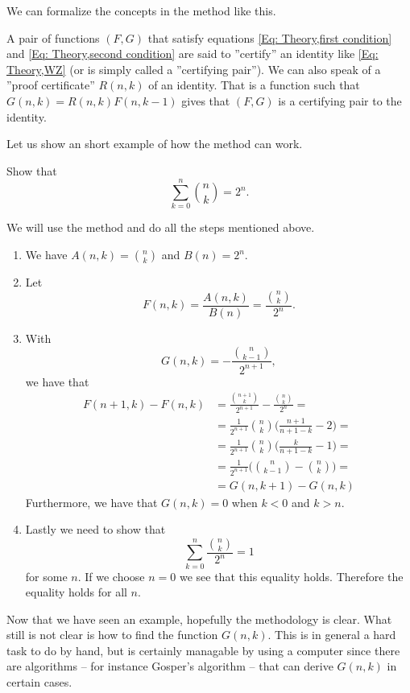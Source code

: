 We can formalize the concepts in the method like this.
\begin{definition}
  A pair of functions $(F,G)$ that satisfy equations \ref{Eq: Theory,first condition} and \ref{Eq: Theory,second condition} are said to ''certify'' an identity like \ref{Eq: Theory,WZ} (or is simply called a ''certifying pair''). We can also speak of a ''proof certificate'' $R(n,k)$ of an identity. That is a function such that $G(n,k)=R(n,k)F(n,k-1)$ gives that $(F,G)$ is a certifying pair to the identity.
\end{definition}
Let us show an short example of how the method can work.
\begin{example}
  Show that $$\sum_{k=0}^n \binom{n}{k} = 2^n.$$
\end{example}
\begin{solution}
  We will use the method and do all the steps mentioned above.
  \begin{enumerate}
    \item We have $A(n,k)=\binom{n}{k}$ and $B(n)=2^n$.
    \item Let $$F(n,k)=\frac{A(n,k)}{B(n)}=\frac{\binom{n}{k}}{2^n}.$$
    \item With $$G(n,k)=-\frac{\binom{n}{k-1}}{2^{n+1}},$$ we have that
      \begin{equation*}
        \begin{split}
          F(n+1,k)-F(n,k) & = \frac{\binom{n+1}{k}}{2^{n+1}}-\frac{\binom{n}{k}}{2^{n}}= \\
          & = \frac{1}{2^{n+1}}\binom{n}{k}\Bigg(\frac{n+1}{n+1-k}-2\Bigg) = \\
          & = \frac{1}{2^{n+1}}\binom{n}{k}\Bigg(\frac{k}{n+1-k}-1\Bigg) = \\
          & = \frac{1}{2^{n+1}}\Bigg(\binom{n}{k-1}-\binom{n}{k}\Bigg) = \\
          & = G(n,k+1)-G(n,k)
        \end{split}
      \end{equation*}
      Furthermore, we have that $G(n,k) = 0$ when $k<0$ and $k>n$.
    \item Lastly we need to show that $$\sum_{k=0}^n \frac{\binom{n}{k}}{2^n}=1$$ for some $n$. If we choose $n=0$ we see that this equality holds. Therefore the equality holds for all $n$.
  \end{enumerate}
\end{solution}
Now that we have seen an example, hopefully the methodology is clear. What still is not clear is how to find the function $G(n,k)$. This is in general a hard task to do by hand, but is certainly managable by using a computer since there are algorithms -- for instance Gosper's algorithm -- that can derive $G(n,k)$ in certain cases.

